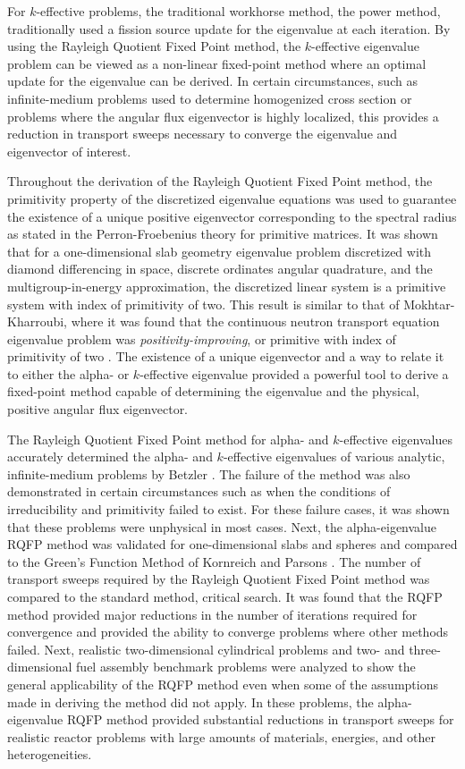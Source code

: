 For $k$-effective problems, the traditional workhorse method, the power method, traditionally used a fission source update for the eigenvalue at each iteration. By using the Rayleigh Quotient Fixed Point method, the $k$-effective eigenvalue problem can be viewed as a non-linear fixed-point method where an optimal update for the eigenvalue can be derived. In certain circumstances, such as infinite-medium problems used to determine homogenized cross section or problems where the angular flux eigenvector is highly localized, this provides a reduction in transport sweeps necessary to converge the eigenvalue and eigenvector of interest.

Throughout the derivation of the Rayleigh Quotient Fixed Point method, the primitivity property of the discretized eigenvalue equations was used to guarantee the existence of a unique positive eigenvector corresponding to the spectral radius as stated in the Perron-Froebenius theory for primitive matrices. It was shown that for a one-dimensional slab geometry eigenvalue problem discretized with diamond differencing in space, discrete ordinates angular quadrature, and the multigroup-in-energy approximation, the discretized linear system is a primitive system with index of primitivity of two. This result is similar to that of Mokhtar-Kharroubi, where it was found that the continuous neutron transport equation eigenvalue problem was \textit{positivity-improving}, or primitive with index of primitivity of two \cite{mokhtar1997mathematical}. The existence of a unique eigenvector and a way to relate it to either the alpha- or $k$-effective eigenvalue provided a powerful tool to derive a fixed-point method capable of determining the eigenvalue and the physical, positive angular flux eigenvector.

The Rayleigh Quotient Fixed Point method for alpha- and $k$-effective eigenvalues accurately determined the alpha- and $k$-effective eigenvalues of various analytic, infinite-medium problems by Betzler \cite{Betzler2014Alpha}. The failure of the method was also demonstrated in certain circumstances such as when the conditions of irreducibility and primitivity failed to exist. For these failure cases, it was shown that these problems were unphysical in most cases. Next, the alpha-eigenvalue RQFP method was validated for one-dimensional slabs and spheres and compared to the Green's Function Method of Kornreich and Parsons \cite{kornreich_timeeigenvalue_2005}. The number of transport sweeps required by the Rayleigh Quotient Fixed Point method was compared to the standard method, critical search. It was found that the RQFP method provided major reductions in the number of iterations required for convergence and provided the ability to converge problems where other methods failed. Next, realistic two-dimensional cylindrical problems and two- and three-dimensional fuel assembly benchmark problems were analyzed to show the general applicability of the RQFP method  even when some of the assumptions made in deriving the method did not apply. In these problems, the alpha-eigenvalue RQFP method provided substantial reductions in transport sweeps for realistic reactor problems with large amounts of materials, energies, and other heterogeneities.

